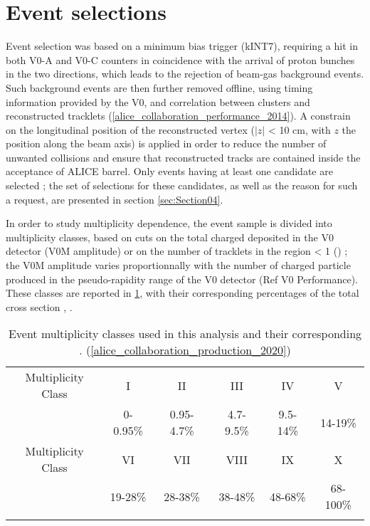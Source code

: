 \section{Event selections}
\label{sec:Section03}

Event selection was based on a minimum bias trigger (kINT7), requiring a hit in both V0-A and V0-C counters in coincidence with the arrival of proton bunches in the two directions, which leads to the rejection of beam-gas background events. Such background events are then further removed offline, using timing information provided by the V0, and correlation between clusters and reconstructed tracklets (\ref{alice_collaboration_performance_2014}). A constrain on the longitudinal position of the reconstructed vertex ($|z|$ < 10 cm, with $z$ the position along the beam axis) is applied in order to reduce the number of unwanted collisions and ensure that reconstructed tracks are contained inside the acceptance of ALICE barrel. Only events having at least one \rmOmegaPM candidate are selected ; the set of selections for these candidates, as well as the reason for such a request, are presented in section \ref{sec:Section04}.

In order to study multiplicity dependence, the event sample is divided into multiplicity classes, based on cuts on the total charged deposited in the V0 detector (V0M amplitude) or on the number of tracklets in the region \abspseudorap < 1 (\Ntracklet) ; the V0M amplitude varies proportionnally with the number of charged particle produced in the pseudo-rapidity range of the V0 detector (Ref V0 Performance). These classes are reported in \tab \ref{MultClass}, with their corresponding percentages of the total cross section \INELZero, \sigmaINELZero.

\begin{table}[h]
    \centering
    \begin{tabular}{c|ccccc}
    \noalign{\smallskip}\hline \hline \noalign{\smallskip}
    Multiplicity Class & I & II & III & IV & V \\
	\sigmaINELZero & 0-0.95\% & 0.95-4.7\% & 4.7-9.5\% & 9.5-14\% & 14-19\% \\	        	\noalign{\smallskip}\hline \hline \noalign{\smallskip}
	Multiplicity Class & VI & VII & VIII & IX & X \\
	\sigmaINELZero & 19-28\% & 28-38\% & 38-48\% & 48-68\% & 68-100\% \\
    \noalign{\smallskip}\hline \hline \noalign{\smallskip}
    \end{tabular}
    \caption{Event multiplicity classes used in this analysis and their corresponding \sigmaINELZero. (\ref{alice_collaboration_production_2020})}\label{MultClass}
\end{table}
